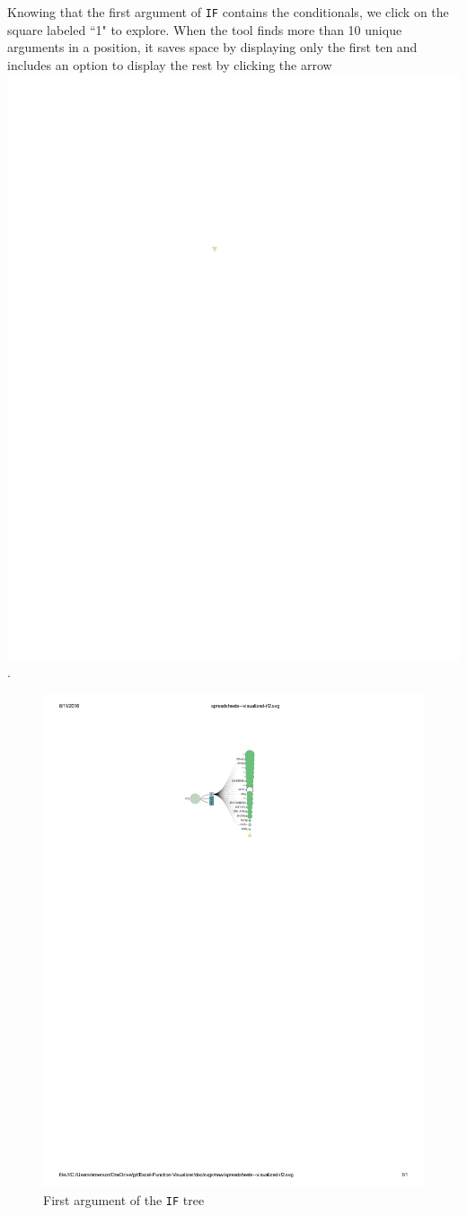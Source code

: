 \documentclass[conference]{IEEEtran}
\begin{document}
	Knowing that the first argument of \texttt{IF} contains the conditionals, we click on
	the square labeled ``1" to explore. When the tool finds more than 10 unique
	arguments in a position, it saves space by displaying only the first ten and
	includes an option to display the rest by clicking the arrow
	\includegraphics{glossary-arrow}.
	
	\begin{figure}[h] \centering \includegraphics[width=0.7\columnwidth]{IFexpand}
		\caption{First argument of the \texttt{IF} tree} \label{fig:expandif} \end{figure}
	
\end{document}
